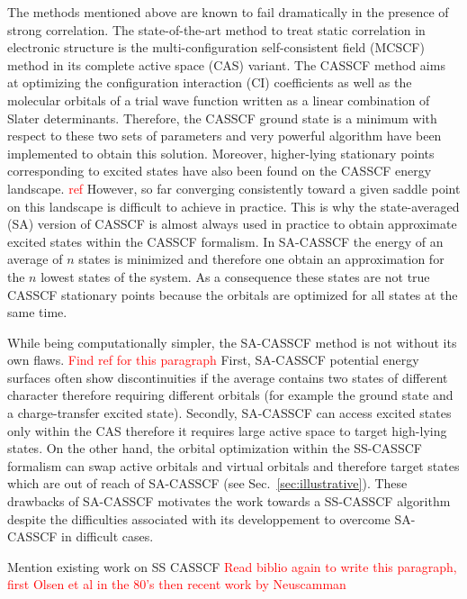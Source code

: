 \documentclass[aps,prb,reprint,showkeys,superscriptaddress]{revtex4-1}
\newcommand{\todo}[1]{\textcolor{red}{#1}}
\begin{document}
The methods mentioned above are known to fail dramatically in the presence of strong correlation. \cite{Jensen_2017}
The state-of-the-art method to treat static correlation in electronic structure is the multi-configuration self-consistent field (MCSCF) method in its complete active space (CAS) variant. \cite{Roos_2016}
The CASSCF method aims at optimizing the configuration interaction (CI) coefficients as well as the molecular orbitals of a trial wave function written as a linear combination of Slater determinants. \cite{Helgaker_2000,Roos_2016}
Therefore, the CASSCF ground state is a minimum with respect to these two sets of parameters and very powerful algorithm have been implemented to obtain this solution. \cite{Roos_1980,Werner_1985,Sun_2017,Kreplin_2019,Kreplin_2020}
Moreover, higher-lying stationary points corresponding to excited states have also been found on the CASSCF energy landscape. \todo{ref}
However, so far converging consistently toward a given saddle point on this landscape is difficult to achieve in practice.
This is why the state-averaged (SA) version of CASSCF is almost always used in practice to obtain approximate excited states within the CASSCF formalism.
In SA-CASSCF the energy of an average of $n$ states is minimized and therefore one obtain an approximation for the $n$ lowest states of the system.
As a consequence these states are not true CASSCF stationary points because the orbitals are optimized for all states at the same time.

While being computationally simpler, the SA-CASSCF method is not without its own flaws. \todo{Find ref for this paragraph}
First, SA-CASSCF potential energy surfaces often show discontinuities if the average contains two states of different character therefore requiring different orbitals (for example the ground state and a charge-transfer excited state).
Secondly, SA-CASSCF can access excited states only within the CAS therefore it requires large active space to target high-lying states.
On the other hand, the orbital optimization within the SS-CASSCF formalism can swap active orbitals and virtual orbitals and therefore target states which are out of reach of SA-CASSCF (see Sec.~\ref{sec:illustrative}).
These drawbacks of SA-CASSCF motivates the work towards a SS-CASSCF algorithm despite the difficulties associated with its developpement to overcome SA-CASSCF in difficult cases.

\textsection Mention existing work on SS CASSCF \todo{Read biblio again to write this paragraph, first Olsen et al in the 80's then recent work by Neuscamman \etal} \cite{Golab_1983,Golab_1985,Olsen_1982,Olsen_1983,Rizzo_1990,Guihery_1997,Angeli_2003,Tran_2019,Tran_2020,Hanscam_2021}
\end{document}
